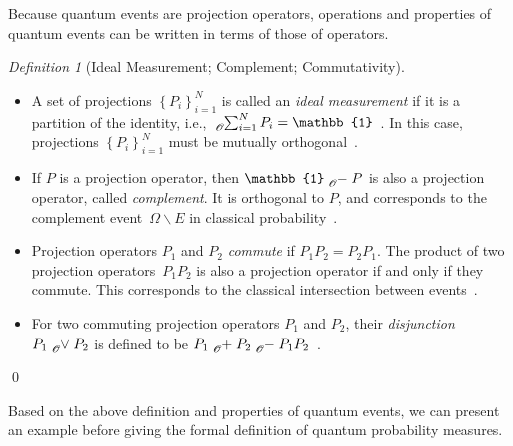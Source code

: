 \documentclass{article}
\theoremstyle{remark}
\newtheorem{definition}{Definition}
\begin{document}
Because quantum events are projection operators, operations and properties
of quantum events can be written in terms of those of operators.

\begin{definition}[Ideal Measurement; Complement; Commutativity]~ 
\begin{itemize}
\item A set of projections $\left\{ P_{i}\right\} _{i=1}^{N}$ is called
an \emph{ideal measurement} if it is a partition of the identity,
i.e., $\tensor*[_{\mathscr{O}}]{\sum}{_{i=1}^{N}}P_{i}=\mathbb{1}$~\cite{Swart2013}.
In this case, projections $\left\{ P_{i}\right\} _{i=1}^{N}$ must
be mutually orthogonal~\cite{Griffiths2003}.
\item If $P$ is a projection operator, then $\mathbb{1}\tensor*[_{\mathscr{O}}]{-}{}P$
is also a projection operator, called \emph{complement}. It is orthogonal
to $P$, and corresponds to the complement event~$\Omega\backslash E$
in classical probability~\cite{Griffiths2003}. 
\item Projection operators $P_{1}$ and $P_{2}$ \emph{commute} if $P_{1}P_{2}=P_{2}P_{1}$.
The product of two projection operators~$P_{1}P_{2}$ is also a projection
operator if and only if they commute. This corresponds to the classical
intersection between events~\cite{peres1995quantum,Griffiths2003}. 
\item For two commuting projection operators $P_{1}$ and $P_{2}$, their
\emph{disjunction}~$P_{1}\tensor*[_{\mathscr{O}}]{\vee}{}P_{2}$
is defined to be $P_{1}\tensor*[_{\mathscr{O}}]{+}{}P_{2}\tensor*[_{\mathscr{O}}]{-}{}P_{1}P_{2}$~\cite{Griffiths2003}. 
\end{itemize}
\qed\end{definition}

Based on the above definition and properties of quantum events, we
can present an example before giving the formal definition of quantum
probability measures.
\end{document}
